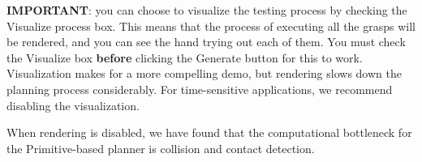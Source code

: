 \textbf{IMPORTANT}: you can choose to visualize the testing process by
checking the Visualize process box. This means that the process of
executing all the grasps will be rendered, and you can see the hand
trying out each of them. You must check the Visualize box
\textbf{before} clicking the Generate button for this to
work. Visualization makes for a more compelling demo, but rendering
slows down the planning process considerably. For time-sensitive
applications, we recommend disabling the visualization.

When rendering is disabled, we have found that the computational
bottleneck for the Primitive-based planner is collision and contact
detection.
